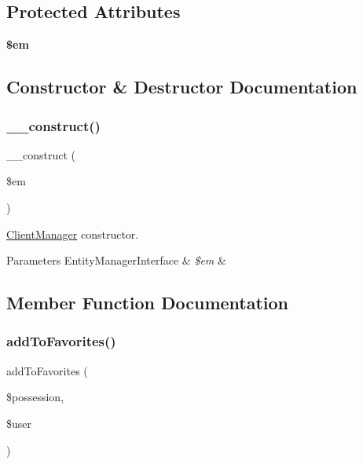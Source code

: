 \subsection*{Protected Attributes}
\begin{DoxyCompactItemize}
\item 
\mbox{\label{class_app_1_1_b_l_1_1_client_manager_a0f2991d5fed029ef50ef619f1a532d06}} 
{\bfseries \$em}
\end{DoxyCompactItemize}


\subsection{Constructor \& Destructor Documentation}
\mbox{\label{class_app_1_1_b_l_1_1_client_manager_a25f4258aeb5ce2a61a2504cb7c058485}} 
\subsubsection{\texorpdfstring{\_\_construct()}{\_\_construct()}}
{\footnotesize\ttfamily \+\_\+\+\_\+construct (\begin{DoxyParamCaption}\item[{Entity\+Manager\+Interface}]{\$em }\end{DoxyParamCaption})}

\mbox{\hyperlink{class_app_1_1_b_l_1_1_client_manager}{Client\+Manager}} constructor. 
\begin{DoxyParams}[1]{Parameters}
Entity\+Manager\+Interface & {\em \$em} & \\
\hline
\end{DoxyParams}


\subsection{Member Function Documentation}
\mbox{\label{class_app_1_1_b_l_1_1_client_manager_ab1d089c74735e10bda2c731e7f6084b5}} 
\subsubsection{\texorpdfstring{addToFavorites()}{addToFavorites()}}
{\footnotesize\ttfamily add\+To\+Favorites (\begin{DoxyParamCaption}\item[{\mbox{\hyperlink{class_app_1_1_entity_1_1_possession}{Possession}}}]{\$possession,  }\item[{\mbox{\hyperlink{class_app_1_1_entity_1_1_user}{User}}}]{\$user }\end{DoxyParamCaption})}


